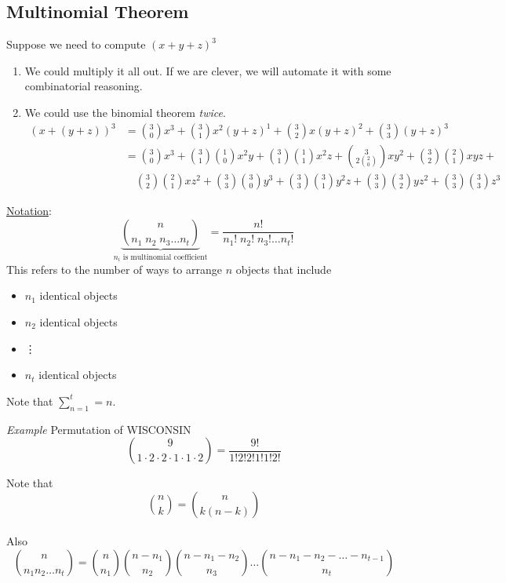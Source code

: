 \documentclass[12pt]{article}
\begin{document}
\vspace{1.5\baselineskip}
\subsection{Multinomial Theorem}
Suppose we need to compute $(x+y+z)^3$
\begin{enumerate}
    \item We could multiply it all out. If we are clever, we will automate it with some combinatorial reasoning.
    \item We could use the binomial theorem {\sl twice}.
    \begin{align*}
        (x+(y+z))^3 &= \binom{3}{0}x^3+\binom{3}{1}x^2(y+z)^1 + \binom{3}{2}x(y+z)^2+\binom{3}{3}(y+z)^3 \\
        &= \binom{3}{0}x^3 + \binom{3}{1}\binom{1}{0}x^2y +\binom{3}{1}\binom{1}{1}x^2z+\binom{3}{2\binom{2}0}xy^2+\binom{3}{2}\binom{2}{1}xyz+\\
        &\quad\binom{3}{2}\binom{2}{1}xz^2+\binom{3}{3}\binom{3}{0}y^3+\binom{3}{3}\binom{3}{1}y^2z+\binom{3}{3}\binom{3}{2}yz^2+\binom{3}{3}\binom{3}{3}z^3
    \end{align*}
\end{enumerate}

\vspace{1.5\baselineskip}
\underline{Notation}: $$\underbrace{\binom{n}{n_1\;n_2\;n_3\ldots n_t}}_{\text{$n_i$ is multinomial coefficient}} = \frac{n!}{n_1!\;n_2!\;n_3!\ldots n_t!}$$
This refers to the number of ways to arrange $n$ objects that include 
\begin{itemize}
    \item[] $n_1$ identical objects
    \item[] $n_2$ identical objects
    \item[] \qquad\qquad\vdots
    \item[] $n_t$ identical objects
\end{itemize}
Note that $\sum\limits_{n=1}^t=n$.

\vspace{1.5\baselineskip}
{\sl Example} Permutation of WISCONSIN
$$\binom{9}{1\cdot2\cdot2\cdot1\cdot1\cdot2}=\frac{9!}{1!2!2!1!1!2!}$$

\vspace{1.5\baselineskip}
Note that $$\binom{n}{k} = \binom{n}{k(n-k)}$$\\
Also
$$\binom{n}{n_1n_2\ldots n_t} = \binom{n}{n_1}\binom{n-n_1}{n_2}\binom{n-n_1-n_2}{n_3}\ldots\binom{n-n_1-n_2-\ldots-n_{t-1}}{n_t}$$
\end{document}
